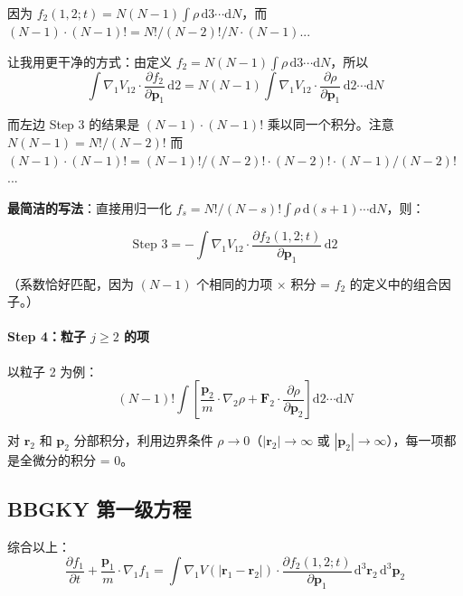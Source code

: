 \documentclass[11pt,a4paper]{article}
\newcommand{\ri}{\mathbf{r}}
\newcommand{\piu}{\mathbf{p}}
\begin{document}
因为 $f_2(1,2;t) = N(N-1)\int\rho\,\mathrm{d} 3\cdots\mathrm{d} N$，而 $(N-1)\cdot(N-1)! = N!/(N-2)!/N \cdot (N-1)$... 

让我用更干净的方式：由定义 $f_2 = N(N-1)\int\rho\,\mathrm{d} 3\cdots\mathrm{d} N$，所以
\begin{equation}
\int \nabla_1 V_{12}\cdot\frac{\partial f_2}{\partial\piu_1}\,\mathrm{d} 2 = N(N-1)\int \nabla_1 V_{12}\cdot\frac{\partial\rho}{\partial\piu_1}\,\mathrm{d} 2\cdots\mathrm{d} N
\end{equation}

而左边 Step 3 的结果是 $(N-1)\cdot(N-1)!$ 乘以同一个积分。注意 $N(N-1) = N!/(N-2)!$ 而 $(N-1)\cdot(N-1)! = (N-1)!/(N-2)!\cdot(N-2)!\cdot(N-1)/(N-2)!$...

\textbf{最简洁的写法}：直接用归一化 $f_s = N!/(N-s)!\int\rho\,\mathrm{d}(s+1)\cdots\mathrm{d} N$，则：

\begin{equation}
\text{Step 3} = -\int \nabla_1 V_{12}\cdot\frac{\partial f_2(1,2;t)}{\partial\piu_1}\,\mathrm{d} 2
\end{equation}

（系数恰好匹配，因为 $(N-1)$ 个相同的力项 $\times$ 积分 = $f_2$ 的定义中的组合因子。）

\paragraph{Step 4：粒子 $j\ge 2$ 的项}

以粒子 2 为例：
\begin{equation}
(N-1)!\int\left[\frac{\piu_2}{m}\cdot\nabla_2\rho + \mathbf{F}_2\cdot\frac{\partial\rho}{\partial\piu_2}\right]\mathrm{d} 2\cdots\mathrm{d} N
\end{equation}

对 $\ri_2$ 和 $\piu_2$ 分部积分，利用边界条件 $\rho\to 0$（$|\ri_2|\to\infty$ 或 $|\piu_2|\to\infty$），每一项都是全微分的积分 = 0。

\subsection{BBGKY 第一级方程}

综合以上：
\begin{equation}
\boxed{\frac{\partial f_1}{\partial t} + \frac{\piu_1}{m}\cdot\nabla_1 f_1 = \int \nabla_1 V(|\ri_1-\ri_2|)\cdot\frac{\partial f_2(1,2;t)}{\partial\piu_1}\,\mathrm{d}^3\ri_2\,\mathrm{d}^3\piu_2}
\end{equation}
\end{document}

